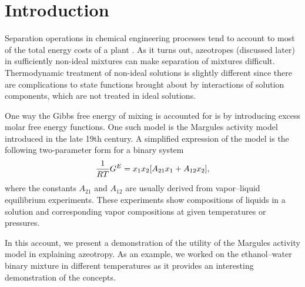 \section{Introduction}



Separation operations in chemical engineering processes tend
to account to most of the total energy costs of a plant \cite{seppaper}. As
it turns out, azeotropes (discussed later) in sufficiently non-ideal
mixtures can make separation of mixtures difficult.
Thermodynamic treatment of non-ideal solutions is slightly different since
there are complications to state functions brought about by interactions of
solution components, which are not treated in ideal solutions.

One way the Gibbs free energy of mixing is accounted for is by introducing
excess molar free energy functions. One such model is the Margules activity model
introduced in the late 19th century. A simplified expression of the model
is the following two-parameter form for a binary system \cite[pp.~430]{enggbook}
\begin{equation}\label{eq:margules-two-param}
    \dfrac1{RT} G^E = x_1x_2 \qty[A_{21}x_1 + A_{12}x_2],
\end{equation}
where the constants $A_{21}$ and $A_{12}$ are usually derived from vapor--liquid
equilibrium experiments. These experiments show compositions of liquids in a
solution and corresponding vapor compositions at given temperatures or pressures.

In this account, we present a demonstration of the utility of the Margules
activity model in explaining azeotropy.
As an example, we worked on the ethanol--water binary mixture in different
temperatures as it provides an interesting demonstration of the concepts.

